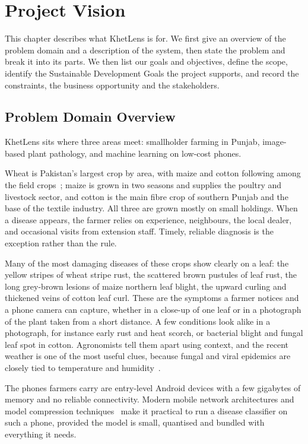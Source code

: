 \chapter{Project Vision}
\label{ch:vision}

This chapter describes what KhetLens is for. We first give an overview of the problem domain and a description of the system, then state the problem and break it into its parts. We then list our goals and objectives, define the scope, identify the Sustainable Development Goals the project supports, and record the constraints, the business opportunity and the stakeholders.

\section{Problem Domain Overview}
\label{sec:domain}
KhetLens sits where three areas meet: smallholder farming in Punjab, image-based plant pathology, and machine learning on low-cost phones.

Wheat is Pakistan's largest crop by area, with maize and cotton following among the field crops~\cite{fao_pakistan}; maize is grown in two seasons and supplies the poultry and livestock sector, and cotton is the main fibre crop of southern Punjab and the base of the textile industry. All three are grown mostly on small holdings. When a disease appears, the farmer relies on experience, neighbours, the local dealer, and occasional visits from extension staff. Timely, reliable diagnosis is the exception rather than the rule.

Many of the most damaging diseases of these crops show clearly on a leaf: the yellow stripes of wheat stripe rust, the scattered brown pustules of leaf rust, the long grey-brown lesions of maize northern leaf blight, the upward curling and thickened veins of cotton leaf curl. These are the symptoms a farmer notices and a phone camera can capture, whether in a close-up of one leaf or in a photograph of the plant taken from a short distance. A few conditions look alike in a photograph, for instance early rust and heat scorch, or bacterial blight and fungal leaf spot in cotton. Agronomists tell them apart using context, and the recent weather is one of the most useful clues, because fungal and viral epidemics are closely tied to temperature and humidity~\cite{ali2023striperust,ahmad2018clcuv}.

The phones farmers carry are entry-level Android devices with a few gigabytes of memory and no reliable connectivity. Modern mobile network architectures and model compression techniques~\cite{howard2019mnv3,hinton2015kd} make it practical to run a disease classifier on such a phone, provided the model is small, quantised and bundled with everything it needs.

